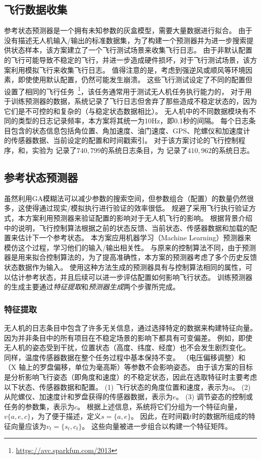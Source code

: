 \subsection{飞行数据收集}\label{subsec:log_gen}
参考状态预测器是一个拥有未知参数的灰盒模型，需要大量数据进行拟合。
由于没有描述无人机输入/输出的标准数据集，为了构建一个预测器并为进一步搜索提供状态样本，该方案建立了一个飞行测试场景来收集飞行日志。
由于非默认配置的飞行可能导致不稳定的飞行，并进一步造成硬件损坏，对于飞行测试场景，该方案利用模拟飞行来收集飞行日志。
值得注意的是，考虑到强逆风或顺风等环境因素，即使使用默认配置，仍然可能发生崩溃。
这些飞行测试设定了不同的配置但设置了相同的飞行任务~\footnote{\url{https://avc.sparkfun.com/2013}}，该任务通常用于测试无人机任务执行能力的，
对于用于训练预测器的数据，系统记录了飞行日志但舍弃了那些造成不稳定状态的，因为它们是不可控的和复杂的（与稳定状态数据相比）。
无人机中的不同数据模块有不同的类型的日志记录频率，本方案将其统一为10Hz，即0.1秒的间隔。
每个日志条目包含的状态信息包括角位置、角加速度、油门速度、GPS、陀螺仪和加速度计的传感器数据、当前设定的配置和时间戳索引。
对于该方案讨论的飞行控制程序，和，实验为 记录了$740,799$的系统日志条目，为 记录了$410,962$的系统日志。
    
\subsection{参考状态预测器}
虽然利用GA模糊法可以减少参数的搜索空间，但参数组合（配置）的数量仍然很多，这使得通过现实/模拟执行进行验证的效率很低。
规避了采用飞行执行验证方式，本方案利用预测器来验证配置的影响对于无人机飞行的影响。
根据背景介绍中的说明，飞行控制算法根据之前的状态反馈、当前状态、传感器数据和加载的配置来估计下一个参考状态。
本方案应用机器学习（Machine Learning）预测器来模仿这个过程，学习他们的输入/输出相关性。
与原来的控制算法不同，由于预测器是用来拟合控制算法的，为了提高准确性，本方案的预测器考虑了多个历史反馈状态数据作为输入。
使用这种方法生成的预测器具有与控制算法相同的属性，可以估计参考状态，并且后续可以进一步评估配置如何影响飞行状态。
训练预测器的生成主要通过\emph{特征提取}和\emph{预测器生成}两个步骤所完成。


\subsubsection{特征提取}
无人机的日志条目中包含了许多无关信息，\icsearcher 通过选择特定的数据来构建特征向量。
因为并非条目中的所有项目在不稳定场景的影响下都具有可变偏差。
例如，即使无人机的姿态受到干扰，位置状态（高度、纬度、经度）也不会发生剧烈变化。
同样，温度传感器数据在整个任务过程中基本保持不变。
（电压偏移调整）和 （X 轴上的罗盘偏移，单位为毫高斯）等参数不会影响姿态。
由于该方案的目标是分析影响飞行姿态（即角度和速度）的不稳定状态，因此在选取特征时主要考虑以下状态、传感器数据和配置。
(1) 飞行状态的角度位置和速度，表示为$a$。
(2) 从陀螺仪、加速度计和罗盘获得的传感器数据，表示为$e$。
(3) 调节姿态的控制或任务的参数集，表示为$c$。
根据上述信息，系统将它们分组为一个特征向量，$v\{a, e, c\}$，为了便于描述，定义$s=\{a,e\}$。
因此，在时间戳$t$时的数据所组成的特征向量应该为$v_t=\{s_t,c_t\}$。
这些向量被进一步组合以构建一个特征矩阵。

